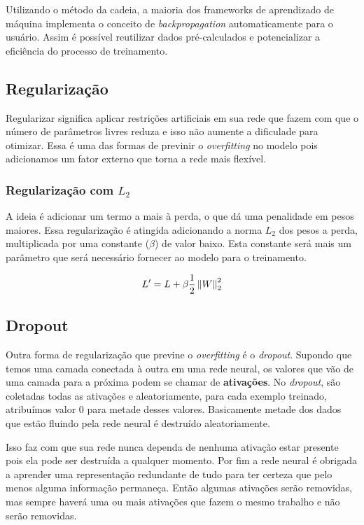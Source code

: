 Utilizando o método da cadeia, a maioria dos frameworks de aprendizado
de máquina implementa o conceito de \textit{backpropagation}
automaticamente para o usuário. Assim é possível reutilizar dados
pré-calculados e potencializar a eficiência do processo de
treinamento.

\subsection{Regularização}

Regularizar significa aplicar restrições artificiais em sua rede que
fazem com que o número de parâmetros livres reduza e isso não aumente
a dificulade para otimizar. Essa é uma das formas de previnir o
\textit{overfitting} no modelo pois adicionamos um fator externo
que torna a rede mais flexível.

\subsubsection{Regularização com $L_2$}

A ideia é adicionar um termo a mais à perda, o que dá uma penalidade
em pesos maiores. Essa regularização é atingida adicionando a norma $L_2$
dos pesos a perda, multiplicada por uma constante ($\beta$) de valor
baixo. Esta constante será mais um parâmetro que será necessário
fornecer ao modelo para o treinamento.

\begin{equation}
L' = L + \beta\frac{1}{2} \left\lVert W\right\rVert_2^2
\end{equation}

\subsection{Dropout}

Outra forma de regularização que previne o \textit{overfitting} é o
\textit{dropout}. Supondo que temos uma camada conectada à outra em
uma rede neural, os valores que vão de uma camada para a próxima
podem se chamar de {\bf ativações}. No \textit{dropout}, são coletadas
todas as ativações e aleatoriamente, para cada exemplo treinado,
atribuímos valor 0 para metade desses valores. Basicamente metade dos
dados que estão fluindo pela rede neural é destruído aleatoriamente.

Isso faz com que sua rede nunca dependa de nenhuma ativação estar
presente pois ela pode ser destruída a qualquer momento. Por fim a
rede neural é obrigada a aprender uma representação redundante de tudo
para ter certeza que pelo menos alguma informação permaneça. Então
algumas ativações serão removidas, mas sempre haverá uma ou mais
ativações que fazem o mesmo trabalho e não serão removidas.

